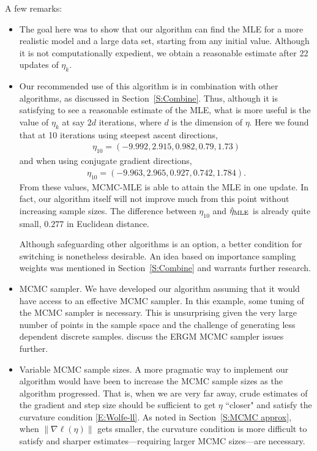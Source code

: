 A few remarks:
\begin{itemize}
\item The goal here was to show that our algorithm can find the MLE for a more realistic model and a large data set, starting from any initial value.
Although it is not computationally expedient, 
we obtain a reasonable estimate after 22 updates of $\eta_k$.  

\item Our recommended use of this algorithm is in combination with other algorithms,
as discussed in Section~\ref{S:Combine}.  Thus, although it is satisfying to 
see a reasonable estimate of the MLE, what is more useful is the value of $\eta_k$ 
at say $2d$ iterations, where $d$ is the dimension of $\eta$.  
Here we found that at 10 iterations using steepest ascent directions,
\begin{align*}
	\eta_{10} =( -9.992,	2.915,	0.982,	0.79	, 1.73) 
\end{align*}
and when using conjugate gradient directions,
\begin{align*}
	\eta_{10} =( -9.963,  2.965,  0.927,  0.742,  1.784).
\end{align*}
From these values, MCMC-MLE is able to attain the MLE in one update.  In fact,
our algorithm itself will not improve much from this point without increasing sample
sizes.  The difference between $\eta_{10}$ and $\hat{\eta}_{\textrm{MLE}}$ is already quite small,
 $0.277$ in Euclidean distance.

Although safeguarding other algorithms is an option, a better condition
for switching is nonetheless desirable.  An idea based on importance sampling weights was mentioned
in Section~\ref{S:Combine} and warrants further research.

\item MCMC sampler.  We have developed our algorithm assuming that it would have access
to an effective MCMC sampler.  In this example, some tuning of the MCMC
sampler is necessary.  
This is unsurprising given the very large number of points in the sample space 
and the challenge of generating less dependent discrete samples. 
\citet{ergm,Morris:2008} discuss the ERGM MCMC sampler issues further.


\item Variable MCMC sample sizes.  A more pragmatic way to implement our 
algorithm would have
been to increase the MCMC sample sizes as the algorithm progressed.  That is, when
we are very far away, crude estimates of the gradient and step size should be sufficient
to get $\eta$ ``closer" and satisfy the curvature condition \eqref{E:Wolfe-ll}.
As noted in Section~\ref{S:MCMC approx}, when $\lVert \nabla \ell(\eta) \rVert$ gets
smaller, the curvature condition is more difficult to satisfy and sharper estimates---requiring larger MCMC sizes---are necessary.
\end{itemize}


